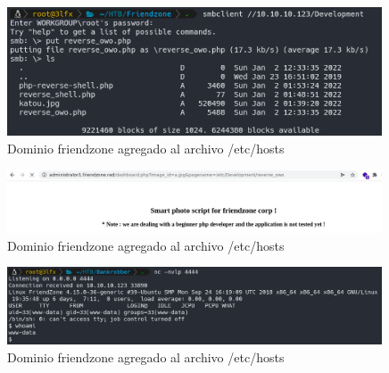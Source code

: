     \begin{figure}[H]
        \centering
        \includegraphics[width=0.99\textwidth]{informe4/imagenes/friendzone/17_reverse_shell_upload.png}
        \caption{Dominio friendzone agregado al archivo /etc/hosts} 
    \end{figure}

    \begin{figure}[H]
        \centering
        \includegraphics[width=0.99\textwidth]{informe4/imagenes/friendzone/18_consult.png}
        \caption{Dominio friendzone agregado al archivo /etc/hosts} 
    \end{figure}

    \begin{figure}[H]
        \centering
        \includegraphics[width=0.99\textwidth]{informe4/imagenes/friendzone/19_conexion_wwwdata.png}
        \caption{Dominio friendzone agregado al archivo /etc/hosts} 
    \end{figure}

